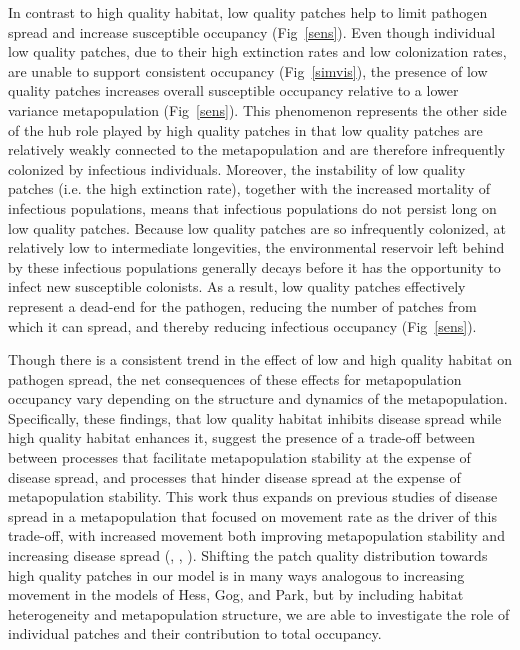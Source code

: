 \documentclass{svjour3}
\begin{document}
In contrast to high quality habitat, low quality patches help to limit pathogen spread and increase susceptible occupancy (Fig~\ref{sens}). Even though individual low quality patches, due to their high extinction rates and low colonization rates, are unable to support consistent occupancy (Fig~\ref{simvis}), the presence of low quality patches increases overall susceptible occupancy relative to a lower variance metapopulation (Fig~\ref{sens}).  This phenomenon represents the other side of the hub role played by high quality patches in that low quality patches are relatively weakly connected to the metapopulation and are therefore infrequently colonized by infectious individuals.  Moreover, the instability of low quality patches (i.e. the high extinction rate), together with the increased mortality of infectious populations, means that infectious populations do not persist long on low quality patches.  Because low quality patches are so infrequently colonized, at relatively low to intermediate longevities, the environmental reservoir left behind by these infectious populations generally decays before it has the opportunity to infect new susceptible colonists.  As a result, low quality patches effectively represent a dead-end for the pathogen, reducing the number of patches from which it can spread, and thereby reducing infectious occupancy (Fig~\ref{sens}). 

Though there is a consistent trend in the effect of low and high quality habitat on pathogen spread, the net consequences of these effects for metapopulation occupancy vary depending on the structure and dynamics of the metapopulation.  Specifically, these findings, that low quality habitat inhibits disease spread while high quality habitat enhances it, suggest the presence of a trade-off between between processes that facilitate metapopulation stability at the expense of disease spread, and processes that hinder disease spread at the expense of metapopulation stability.  This work thus expands on previous studies of disease spread in a metapopulation that focused on movement rate as the driver of this trade-off, with increased movement both improving metapopulation stability and increasing disease spread (\cite{Hess1996}, \cite{Gog2002}, \cite{Park2012}).  Shifting the patch quality distribution towards high quality patches in our model is in many ways analogous to increasing movement in the models of Hess, Gog, and Park, but by including habitat heterogeneity and metapopulation structure, we are able to investigate the role of individual patches and their contribution to total occupancy.
\end{document}
